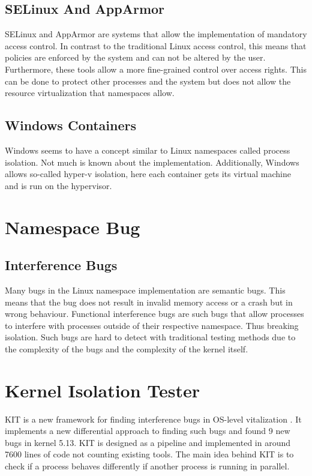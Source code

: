 \documentclass[10pt,twocolumn,a4paper]{article}
\begin{document}
\subsection{SELinux And AppArmor}
SELinux and AppArmor are systems that allow the implementation of mandatory access control. In
contrast to the traditional Linux access control, this means that policies are enforced by the system
and can not be altered by the user. Furthermore, these tools allow a more fine-grained control over
access rights. This can be done to protect other processes and the system but does not allow the resource
virtualization that namespaces allow\cite{26}\cite{27}. 
\subsection{Windows Containers}
Windows seems to have a concept similar to Linux namespaces called process isolation. Not much is known about the
implementation. Additionally, Windows allows so-called hyper-v isolation, here each container
gets its virtual machine and is run on the hypervisor\cite{3}.
\section{Namespace Bug}
\subsection{Interference Bugs}
Many bugs in the Linux namespace implementation are semantic bugs.
This means that the bug does not result in invalid memory access or a crash but in wrong behaviour. 
Functional interference bugs are such bugs that allow processes to interfere with processes
outside of their respective namespace. Thus breaking isolation. Such bugs are hard to detect with traditional testing methods due to the complexity of the bugs and the complexity of the kernel itself.
\section{Kernel Isolation Tester}
KIT is a new framework for finding interference bugs in OS-level vitalization \cite{0}. 
It implements a new differential approach to finding such bugs and found 9 new bugs in kernel 5.13\cite{2}.
KIT is designed as a pipeline and implemented in around 7600 lines of code not counting existing tools\cite{0}.
The main idea behind KIT is to check if a process behaves differently if another process is running
in parallel.
\end{document}
